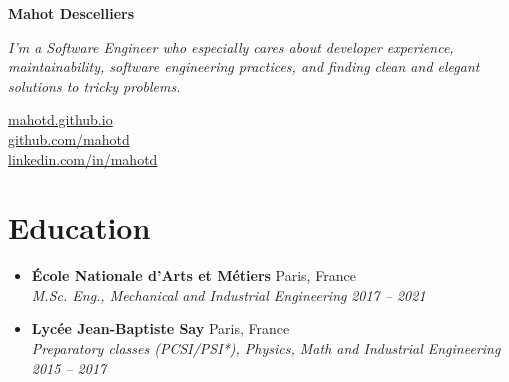 \documentclass[a4paper,11pt]{article}
\newcommand{\entry}[4]{%
\item \textbf{#1} \hfill #2 \\
\textit{\small #3} \hfill \textit{\small #4}}
\newenvironment{entries}{
\begin{itemize}[leftmargin=1.2em, itemsep=4pt, parsep=0pt, topsep=0pt]}{
\end{itemize}}
\begin{document}
\begin{minipage}[t]{0.58\textwidth}
  {\LARGE\textbf{Mahot Descelliers}} \\[4pt]
  \raggedright
  \small\textit{I'm a Software Engineer who especially cares about developer experience,
    maintainability, software engineering practices, and finding clean and elegant solutions
  to tricky problems.}
\end{minipage}%
\hfill
\begin{minipage}[t]{0.4\textwidth}
  \raggedleft
  \href{https://mahotd.github.io}{mahotd.github.io} \\
  \href{https://github.com/mahotd}{github.com/mahotd} \\
  \href{https://www.linkedin.com/in/mahotd/}{linkedin.com/in/mahotd}
\end{minipage}

\section{Education}
\begin{entries}
  \entry{École Nationale d'Arts et Métiers}{Paris, France}{M.Sc. Eng., Mechanical and
  Industrial Engineering}{2017 -- 2021}
  \entry{Lycée Jean-Baptiste Say}{Paris, France}{Preparatory classes (PCSI/PSI*),
  Physics, Math and Industrial Engineering}{2015 -- 2017}
\end{entries}
\end{document}

